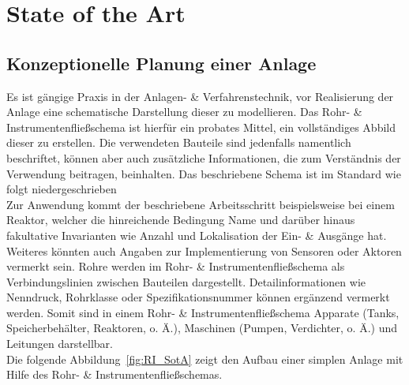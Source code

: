 
\chapter{State of the Art} \label{chapter:stateoftheart}


	\section{Konzeptionelle Planung einer Anlage}
	Es ist gängige Praxis in der Anlagen- \& Verfahrenstechnik, vor Realisierung der Anlage eine schematische Darstellung dieser zu modellieren. Das Rohr- \& Instrumentenfließschema ist hierfür ein probates Mittel, ein vollständiges Abbild dieser zu erstellen. Die verwendeten Bauteile sind jedenfalls namentlich beschriftet, können aber auch zusätzliche Informationen, die zum Verständnis der Verwendung beitragen, beinhalten. Das beschriebene Schema ist im Standard  wie folgt niedergeschrieben \\
	
	Zur Anwendung kommt der beschriebene Arbeitsschritt beispielsweise bei einem Reaktor, welcher die hinreichende Bedingung \glqq Name \grqq \space und darüber hinaus fakultative Invarianten wie Anzahl und Lokalisation der Ein- \& Ausgänge hat. Weiteres könnten auch Angaben zur Implementierung von Sensoren oder Aktoren vermerkt sein. Rohre werden im Rohr- \& Instrumentenfließschema als Verbindungslinien zwischen Bauteilen dargestellt. Detailinformationen wie Nenndruck, Rohrklasse oder Spezifikationsnummer können ergänzend vermerkt werden. Somit sind in einem Rohr- \& Instrumentenfließschema Apparate (Tanks, Speicherbehälter, Reaktoren, o. Ä.), Maschinen (Pumpen, Verdichter, o. Ä.) und Leitungen darstellbar.\\
	
	Die folgende Abbildung~\ref{fig:RI_SotA} zeigt den Aufbau einer simplen Anlage mit Hilfe des Rohr- \& Instrumentenfließschemas.\\


